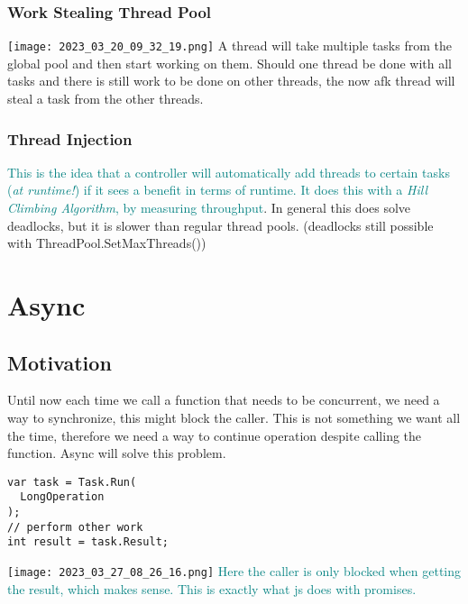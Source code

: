 \documentclass[main.tex,fontsize=8pt,paper=a4,paper=portrait,DIV=calc,]{scrartcl}
\begin{document}
\lstset{
  language=[sharp]C,
    style=code,
}

\subsubsection{Work Stealing Thread Pool}
\texttt{[image: 2023\_03\_20\_09\_32\_19.png]}\newline
A thread will take multiple tasks from the global pool and then start working on them.\newline
Should one thread be done with all tasks and there is still work to be done on other threads, the now afk thread will steal a task from the other threads.

\subsubsection{Thread Injection}
\textcolor{teal}{This is the idea that a controller will automatically add threads to certain tasks (\emph{at runtime!}) if it sees a benefit in terms of runtime.\newline
It does this with a \emph{Hill Climbing Algorithm}, by measuring throughput}. \newline
In general this does solve deadlocks, but it is slower than regular thread pools. (deadlocks still possible with ThreadPool.SetMaxThreads())

\section{Async}

\subsection{Motivation}
Until now each time we call a function that needs to be concurrent, we need a way to synchronize, this might block the caller.\newline
This is not something we want all the time, therefore we need a way to continue operation despite calling the function.\newline
Async will solve this problem.
\begin{lstlisting}
var task = Task.Run(
  LongOperation
);
// perform other work
int result = task.Result;
\end{lstlisting}
\texttt{[image: 2023\_03\_27\_08\_26\_16.png]}\newline
\textcolor{teal}{Here the caller is only blocked when getting the result, which makes sense.\newline
This is exactly what js does with promises.}
\end{document}
